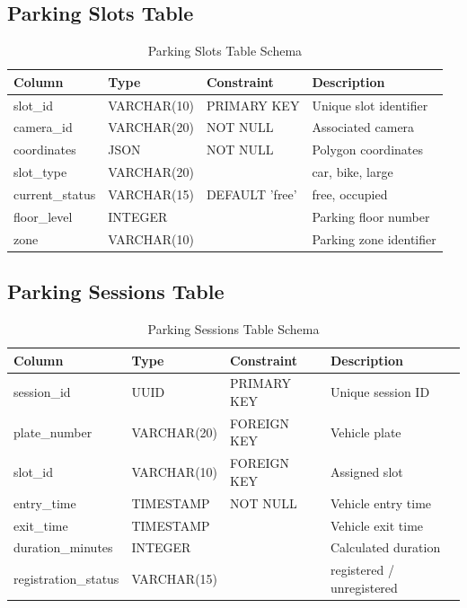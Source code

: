 \documentclass[12pt,a4paper]{report}
\begin{document}
\subsection{Parking Slots Table}

\begin{table}[H]
\centering
\caption{Parking Slots Table Schema}
\begin{tabular}{|l|l|l|l|}
\hline
\textbf{Column} & \textbf{Type} & \textbf{Constraint} & \textbf{Description} \\
\hline
slot\_id & VARCHAR(10) & PRIMARY KEY & Unique slot identifier \\
\hline
camera\_id & VARCHAR(20) & NOT NULL & Associated camera \\
\hline
coordinates & JSON & NOT NULL & Polygon coordinates \\
\hline
slot\_type & VARCHAR(20) & & car, bike, large \\
\hline
current\_status & VARCHAR(15) & DEFAULT 'free' & free, occupied \\
\hline
floor\_level & INTEGER & & Parking floor number \\
\hline
zone & VARCHAR(10) & & Parking zone identifier \\
\hline
\end{tabular}
\end{table}

\subsection{Parking Sessions Table}

\begin{table}[H]
\centering
\caption{Parking Sessions Table Schema}
\begin{tabular}{|l|l|l|l|}
\hline
\textbf{Column} & \textbf{Type} & \textbf{Constraint} & \textbf{Description} \\
\hline
session\_id & UUID & PRIMARY KEY & Unique session ID \\
\hline
plate\_number & VARCHAR(20) & FOREIGN KEY & Vehicle plate \\
\hline
slot\_id & VARCHAR(10) & FOREIGN KEY & Assigned slot \\
\hline
entry\_time & TIMESTAMP & NOT NULL & Vehicle entry time \\
\hline
exit\_time & TIMESTAMP & & Vehicle exit time \\
\hline
duration\_minutes & INTEGER & & Calculated duration \\
\hline
registration\_status & VARCHAR(15) & & registered / unregistered \\
\hline
\end{tabular}
\end{table}
\end{document}
